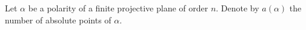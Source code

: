 Let $\alpha$ be a polarity of a finite projective plane of order $n$. Denote by $a(\alpha)$ the number of absolute points of $\alpha$.
